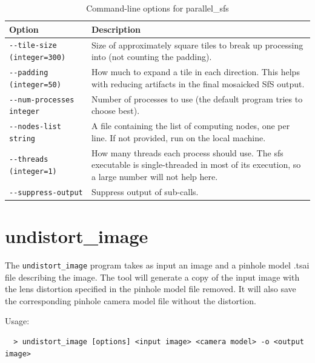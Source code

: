 \begin{longtable}{|l|p{7.5cm}|}
\caption{Command-line options for parallel\_sfs}
\label{tbl:parallel_sfs}
\endfirsthead
\endhead
\endfoot
\endlastfoot
\hline
Option & Description \\ \hline \hline
\texttt{-\/-tile-size (integer=300)} & Size of approximately square tiles to break up processing into (not counting the padding).\\ \hline
\texttt{-\/-padding (integer=50)} & How much to expand a tile in each direction. This helps with reducing artifacts in the final mosaicked SfS output.\\ \hline
\texttt{-\/-num-processes integer} & Number of processes to use (the default program tries to choose best). \\ \hline
\texttt{-\/-nodes-list string} & A file containing the list of computing nodes, one per line. If not provided, run on the local machine.\\ \hline
\texttt{-\/-threads (integer=1)} & How many threads each process should use. The sfs executable is single-threaded in most of its execution, so a large number will not help here.\\ \hline
\texttt{-\/-suppress-output} & Suppress output of sub-calls.\\ \hline
\end{longtable}


\section{undistort\_image}
\label{undistortimage}

The \texttt{undistort\_image} program takes as input an image and a pinhole model .tsai file
describing the image.  The tool will generate a copy of the input image with the lens distortion
specified in the pinhole model file removed. It will also save the corresponding pinhole
camera model file without the distortion. 

Usage:
\begin{verbatim}
  > undistort_image [options] <input image> <camera model> -o <output image>
\end{verbatim}

